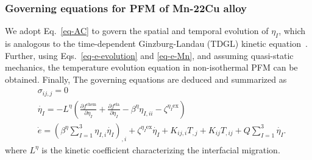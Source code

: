 \documentclass[reprint,3p,sort&compress,times,onecolumn]{elsarticle}
\begin{document}
\subsubsection{Governing equations for PFM  of Mn-22Cu alloy} \label{sec-governing}

We adopt Eq.~\ref{eq-AC} to govern the spatial and temporal evolution of $\eta_I$, which is analogous to the time-dependent Ginzburg-Landau (TDGL) kinetic equation~\cite{de1993crossover,man2010microstructural}. Further, using Eqs.~\ref{eq-e-evolution} and \ref{eq-e-Mn}, and assuming quasi-static mechanics, the temperature evolution equation in non-isothermal PFM can be obtained. Finally, The governing equations are deduced and summarized as
\begin{equation}
\begin{split}
& \sigma_{ij,j}=0     \\
&\dot{\eta_I} =-L^{\eta}\left( \frac{\partial f^{\text{chem}}}{\partial\eta_I}+\frac{\partial f^{\text{ela}}}{\partial\eta_I} - \beta^{\eta} \eta_{I,ii} - \zeta^{\eta_I\text{ex}} \right)     \\
&\dot{e} = \left(\beta^{\eta}\sum_{I=1}^3\eta_{I,i} \dot{\eta_I}\right)_{,i}+\zeta^{\eta_I \text{ex}}\dot{\eta_I}+ K_{ij,i}T_{,j}+K_{ij}T_{,ij} + Q\sum_{I=1}^3 \dot{\eta_I} .
\end{split} \label{eq-governing-equations}
\end{equation}
where $L^{\eta}$ is the kinetic coefficient characterizing the interfacial migration. 

\end{document}
